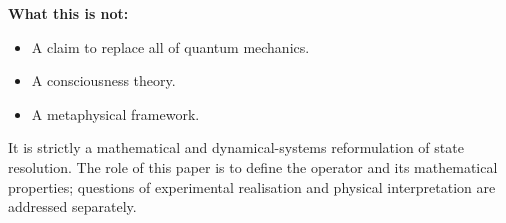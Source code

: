 \documentclass[12pt]{article}
\begin{document}
\textbf{What this is not:}
\begin{itemize}
    \item A claim to replace all of quantum mechanics.
    \item A consciousness theory.
    \item A metaphysical framework.
\end{itemize}

It is strictly a mathematical and dynamical-systems reformulation of state resolution. The role of this paper is to define the operator and its mathematical properties; questions of experimental realisation and physical interpretation are addressed separately.



\end{document}
